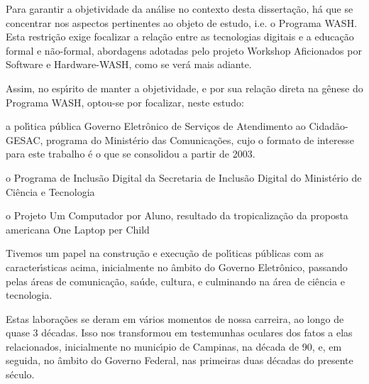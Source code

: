 \documentclass[
12pt,		%
openright,	%
twoside,  %
a4paper,			%
chapter=TITLE,		%
english,			%
french,				%
spanish,			%
brazil				%
]{USPSC-classe/USPSC}
\begin{document}
Para garantir a objetividade da an\'alise no contexto desta disserta\c{c}\~ao, h\'a que se concentrar nos aspectos pertinentes ao objeto de estudo, i.e. o Programa WASH. Esta restri\c{c}\~ao exige focalizar a rela\c{c}\~ao entre as tecnologias digitais e a educa\c{c}\~ao formal e n\~ao-formal, abordagens adotadas pelo projeto Workshop Aficionados por Software e Hardware-WASH, como se ver\'a mais adiante.










Assim, no esp\'{\i}rito de manter a objetividade, e por sua rela\c{c}\~ao direta na g\^enese do Programa WASH, optou-se por focalizar, neste estudo:











\begin{alineas}
\item a pol\'{\i}tica p\'ublica \textquotedbl Governo Eletr\^onico de Servi\c{c}os de Atendimento ao Cidad\~ao-GESAC\textquotedbl , programa do Minist\'erio das Comunica\c{c}\~oes, cujo o formato de interesse para este trabalho \'e o que se consolidou a partir de 2003.
\item o Programa de Inclus\~ao Digital da Secretaria de Inclus\~ao Digital do Minist\'erio de Ci\^encia e Tecnologia
\item o Projeto Um Computador por Aluno, resultado da tropicaliza\c{c}\~ao da proposta americana \textquotedbl One Laptop per Child\textquotedbl 
\end{alineas}

Tivemos um papel na constru\c{c}\~ao e execu\c{c}\~ao de pol\'{\i}ticas p\'ublicas com as caracter\'{\i}sticas acima, inicialmente no \^ambito do Governo Eletr\^onico, passando pelas \'areas de comunica\c{c}\~ao, sa\'ude, cultura, e culminando na \'area de ci\^encia e tecnologia.










Estas labora\c{c}\~oes  se deram em v\'arios momentos de nossa carreira, ao longo de quase 3 d\'ecadas. Isso nos transformou em testemunhas oculares dos fatos a elas relacionados, inicialmente no  munic\'{\i}pio de Campinas, na d\'ecada de 90, e, em seguida, no \^ambito do Governo Federal, nas primeiras duas d\'ecadas do presente s\'eculo.
\end{document}

